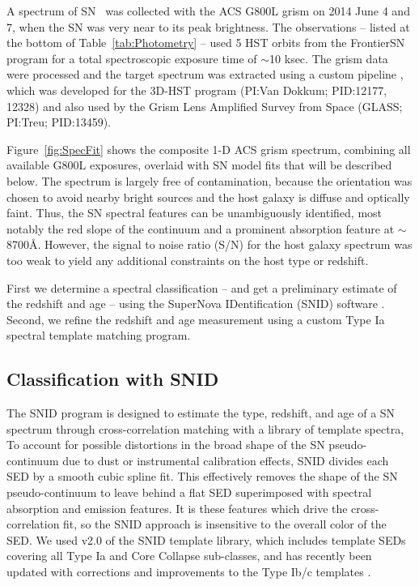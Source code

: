 A spectrum of SN \tomas\ was collected with the ACS G800L grism on
2014 June 4 and 7, when the SN was very near to its peak brightness.
The observations -- listed at the bottom of Table~\ref{tab:Photometry}
-- used 5 HST orbits from the FrontierSN program for a total
spectroscopic exposure time of $\sim$10 ksec.  The grism data were
processed and the target spectrum was extracted using a custom
pipeline \citep{Brammer:2012}, which was developed for the 3D-HST
program (PI:Van Dokkum; PID:12177, 12328) and also used by the Grism
Lens Amplified Survey from Space (GLASS; PI:Treu; PID:13459).

Figure~\ref{fig:SpecFit} shows the composite 1-D ACS grism spectrum,
combining all available G800L exposures, overlaid with SN model fits
that will be described below.  The spectrum is largely free of
contamination, because the orientation was chosen to avoid nearby
bright sources and the host galaxy is diffuse and optically faint.
Thus, the SN spectral features can be unambiguously identified, most
notably the red slope of the continuum and a prominent absorption
feature at $\sim$8700\AA.  However, the signal to noise ratio (S/N)
for the host galaxy spectrum was too weak to yield any additional
constraints on the host type or redshift.

  First we determine a spectral
classification -- and get a preliminary estimate of the redshift and
age -- using the SuperNova IDentification (SNID)
software \citep{Blondin:2007}.  Second, we refine the redshift and age
measurement using a custom Type Ia spectral template matching program.

\subsection{Classification with SNID}
\label{sec:SNID}

The SNID program is designed to estimate the type, redshift, and age
of a SN spectrum through cross-correlation matching with a library of
template spectra, 
To account for possible distortions in the broad shape of the SN
pseudo-continuum due to dust or instrumental calibration effects, SNID
divides each SED by a smooth cubic spline fit. This effectively
removes the shape of the SN pseudo-continuum to leave behind a flat
SED superimposed with spectral absorption and emission features.  It
is these features which drive the cross-correlation fit, so the SNID
approach is insensitive to the overall color of the SED.  We used v2.0
of the SNID template library, which includes template SEDs covering
all Type Ia and Core Collapse sub-classes, and has recently been
updated with corrections and improvements to the Type Ib/c
templates \citep{Liu:2014}.

